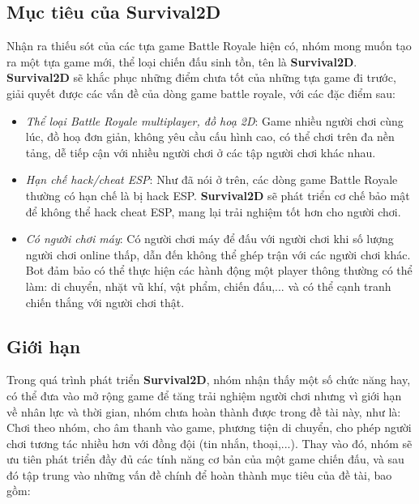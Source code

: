 \documentclass[12pt,a4paper]{article}
\begin{document}

  \subsection{Mục tiêu của Survival2D}

  Nhận ra thiếu sót của các tựa game Battle Royale hiện có, nhóm mong muốn tạo ra một tựa game mới, thể loại chiến đấu sinh tồn, tên là \textbf{Survival2D}. \textbf{Survival2D} sẽ khắc phục những điểm chưa tốt của những tựa game đi trước, giải quyết được các vấn đề của dòng game battle royale, với các đặc điểm sau:
  
  \begin{itemize}
      \item \textit{Thể loại Battle Royale multiplayer, đồ hoạ 2D}: Game nhiều người chơi cùng lúc, đồ hoạ đơn giản, không yêu cầu cấu hình cao, có thể chơi trên đa nền tảng, dễ tiếp cận với nhiều người chơi ở các tập người chơi khác nhau.
      \item \textit{Hạn chế hack/cheat ESP}: Như đã nói ở trên, các dòng game Battle Royale thường có hạn chế là bị hack ESP. \textbf{Survival2D} sẽ phát triển cơ chế bảo mật để không thể hack cheat ESP, mang lại trải nghiệm tốt hơn cho người chơi.
      \item \textit{Có người chơi máy}: Có người chơi máy để đấu với người chơi khi số lượng người chơi online thấp, dẫn đến không thể ghép trận với các người chơi khác. Bot đảm bảo có thể thực hiện các hành động một player thông thường có thể làm: di chuyển, nhặt vũ khí, vật phẩm, chiến đấu,... và có thể cạnh tranh chiến thắng với người chơi thật.
  \end{itemize}
  
  \subsection{Giới hạn}
  
  Trong quá trình phát triển \textbf{Survival2D}, nhóm nhận thấy một số chức năng hay, có thể đưa vào mở rộng game để tăng trải nghiệm người chơi nhưng vì giới hạn về nhân lực và thời gian, nhóm chưa hoàn thành được trong đề tài này, như là: Chơi theo nhóm, cho âm thanh vào game, phương tiện di chuyển, cho phép người chơi tương tác nhiều hơn với đồng đội (tin nhắn, thoại,...). Thay vào đó, nhóm sẽ ưu tiên phát triển đầy đủ các tính năng cơ bản của một game chiến đấu, và sau đó tập trung vào những vấn đề chính để hoàn thành mục tiêu của đề tài, bao gồm:
\end{document}
